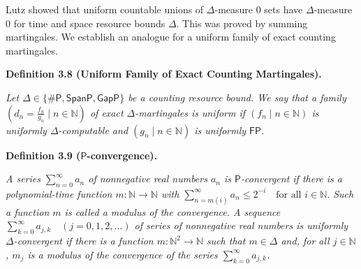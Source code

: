 \documentclass[10pt,a4paper]{article}
\begin{document}



Lutz showed that uniform countable unions of $\Delta$-measure 0 sets have $\Delta$-measure 0 for time and space resource bounds $\Delta$. This was proved by summing martingales. We establish an analogue for a uniform family of exact counting martingales.\par





\par\medskip\noindent\textbf{
\textbf{Definition 3.8}\textbf{ }(Uniform Family of Exact Counting Martingales)\textbf{.}
}\par



\emph{Let $\Delta\in\{{\mathsf{\#}\mathsf{P}},\mathsf{SpanP},\allowbreak\mathsf{GapP}\}$ be a counting resource bound.
We say that a family $\left(d_{n}=\frac{f_{n}}{g_{n}}\mid n\in\mathbb{N}\right)$ of exact $\Delta$-martingales is uniform if $(f_{n}\mid n\in\mathbb{N})$ is uniformly $\Delta$-computable and $(g_{n}\mid n\in\mathbb{N})$ is uniformly $\mathsf{FP}$.}\par







\par\medskip\noindent\textbf{
\textbf{Definition 3.9}\textbf{ }($\mathsf{P}$-convergence)\textbf{.}
}\par



\emph{A series $\sum_{n=0}^{\infty}a_{n}$ of nonnegative real numbers $a_{n}$ is $\mathsf{P}$-convergent if there is a polynomial-time function $m:\mathbb{N}\to\mathbb{N}$ with
$\sum_{n=m(i)}^{\infty}a_{n}\leq 2^{-i}\quad\text{for all }i\in\mathbb{N}.$
Such a function $m$ is called a modulus of the convergence.
A sequence
$\sum_{k=0}^{\infty}a_{j,k}\quad(j=0,1,2,\ldots)$
of series of nonnegative real numbers is uniformly $\Delta$-convergent if there is a function $m:\mathbb{N}^{2}\to\mathbb{N}$ such that $m\in\Delta$ and, for all $j\in\mathbb{N}$, $m_{j}$ is a modulus of the convergence of the series $\sum_{k=0}^{\infty}a_{j,k}$.}\par





\end{document}
